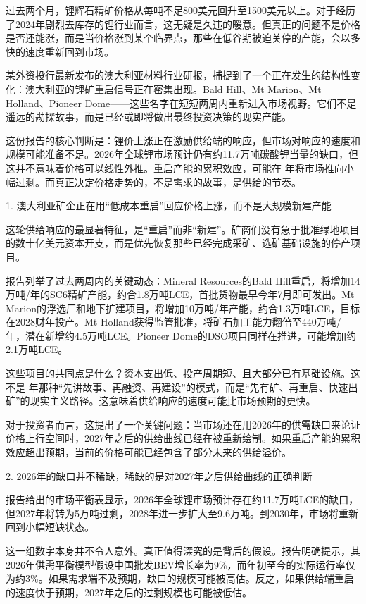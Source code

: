 \documentclass[11pt]{ctexart}
\begin{document}
过去两个月，锂辉石精矿价格从每吨不足800美元回升至1500美元以上。对于经历了2024年剧烈去库存的锂行业而言，这无疑是久违的暖意。但真正的问题不是价格是否还能涨，而是当价格涨到某个临界点，那些在低谷期被迫关停的产能，会以多快的速度重新回到市场。

某外资投行最新发布的澳大利亚材料行业研报，捕捉到了一个正在发生的结构性变化：澳大利亚的锂矿重启信号正在密集出现。Bald Hill、Mt Marion、Mt Holland、Pioneer Dome——这些名字在短短两周内重新进入市场视野。它们不是遥远的勘探故事，而是已经或即将做出最终投资决策的现实产能。

这份报告的核心判断是：锂价上涨正在激励供给端的响应，但市场对响应的速度和规模可能准备不足。2026年全球锂市场预计仍有约11.7万吨碳酸锂当量的缺口，但这并不意味着价格可以线性外推。重启产能的累积效应，可能在 年将市场推向小幅过剩。而真正决定价格走势的，不是需求的故事，是供给的节奏。

1. 澳大利亚矿企正在用“低成本重启”回应价格上涨，而不是大规模新建产能

这轮供给响应的最显著特征，是“重启”而非“新建”。矿商们没有急于批准绿地项目的数十亿美元资本开支，而是优先恢复那些已经完成采矿、选矿基础设施的停产项目。

报告列举了过去两周内的关键动态：Mineral Resources的Bald Hill重启，将增加14万吨/年的SC6精矿产能，约合1.8万吨LCE，首批货物最早今年7月即可发出。Mt Marion的浮选厂和地下扩建项目，将增加10万吨/年产能，约合1.3万吨LCE，目标在2028财年投产。Mt Holland获得监管批准，将矿石加工能力翻倍至440万吨/年，潜在新增约4.5万吨LCE。Pioneer Dome的DSO项目同样在推进，可能增加约2.1万吨LCE。

这些项目的共同点是什么？资本支出低、投产周期短、且大部分已有基础设施。这不是 年那种“先讲故事、再融资、再建设”的模式，而是“先有矿、再重启、快速出矿”的现实主义路径。这意味着供给响应的速度可能比市场预期的更快。

对于投资者而言，这提出了一个关键问题：当市场还在用2026年的供需缺口来论证价格上行空间时，2027年之后的供给曲线已经在被重新绘制。如果重启产能的累积效应超出预期，当前的价格可能已经包含了部分未来的供给溢价。

2. 2026年的缺口并不稀缺，稀缺的是对2027年之后供给曲线的正确判断

报告给出的市场平衡表显示，2026年全球锂市场预计存在约11.7万吨LCE的缺口，但2027年将转为5万吨过剩，2028年进一步扩大至9.6万吨。到2030年，市场将重新回到小幅短缺状态。

这一组数字本身并不令人意外。真正值得深究的是背后的假设。报告明确提示，其2026年供需平衡模型假设中国批发BEV增长率为9\%，而年初至今的实际运行率仅为约3\%。如果需求端不及预期，缺口的规模可能被高估。反之，如果供给端重启的速度快于预期，2027年之后的过剩规模也可能被低估。
\end{document}
